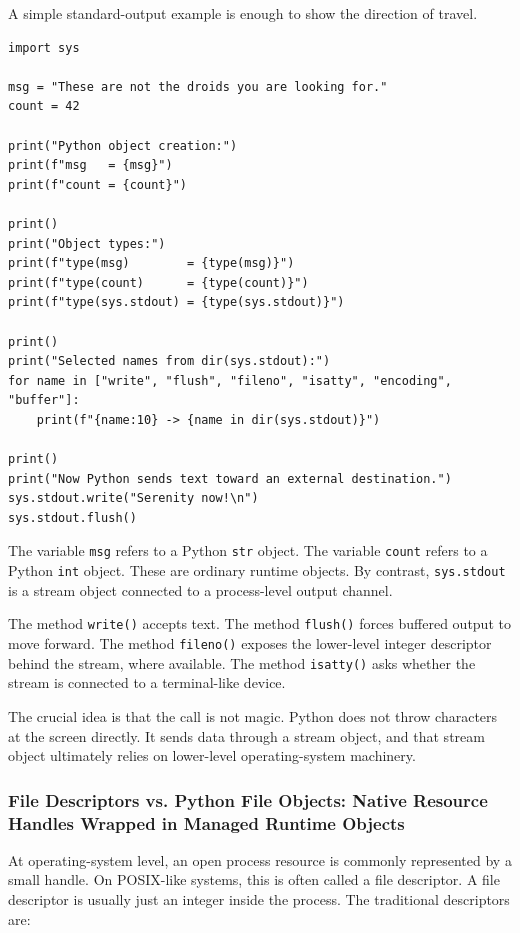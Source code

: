 A simple standard-output example is enough to show the direction of travel.

\begin{verbatim}
import sys

msg = "These are not the droids you are looking for."
count = 42

print("Python object creation:")
print(f"msg   = {msg}")
print(f"count = {count}")

print()
print("Object types:")
print(f"type(msg)        = {type(msg)}")
print(f"type(count)      = {type(count)}")
print(f"type(sys.stdout) = {type(sys.stdout)}")

print()
print("Selected names from dir(sys.stdout):")
for name in ["write", "flush", "fileno", "isatty", "encoding", "buffer"]:
    print(f"{name:10} -> {name in dir(sys.stdout)}")

print()
print("Now Python sends text toward an external destination.")
sys.stdout.write("Serenity now!\n")
sys.stdout.flush()
\end{verbatim}

The variable \texttt{msg} refers to a Python \texttt{str} object. The variable \texttt{count} refers to a Python \texttt{int} object. These are ordinary runtime objects. By contrast, \texttt{sys.stdout} is a stream object connected to a process-level output channel.

The method \texttt{write()} accepts text. The method \texttt{flush()} forces buffered output to move forward. The method \texttt{fileno()} exposes the lower-level integer descriptor behind the stream, where available. The method \texttt{isatty()} asks whether the stream is connected to a terminal-like device.

The crucial idea is that the call is not magic. Python does not throw characters at the screen directly. It sends data through a stream object, and that stream object ultimately relies on lower-level operating-system machinery.

\subsubsection{File Descriptors vs. Python File Objects: Native Resource Handles Wrapped in Managed Runtime Objects}

At operating-system level, an open process resource is commonly represented by a small handle. On POSIX-like systems, this is often called a file descriptor. A file descriptor is usually just an integer inside the process. The traditional descriptors are:

